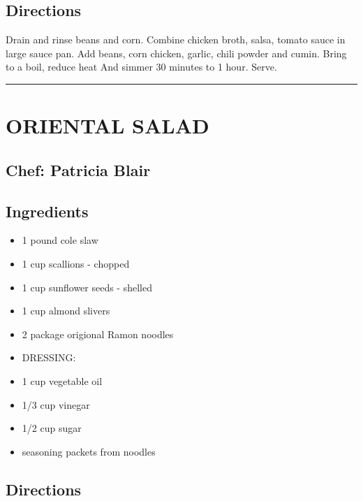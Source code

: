 \documentclass[
]{book}
\providecommand{\tightlist}{%
  \setlength{\itemsep}{0pt}\setlength{\parskip}{0pt}}
\begin{document}
\hypertarget{directions-21}{%
\subsection*{Directions}\label{directions-21}}


Drain and rinse beans and corn. Combine chicken broth, salsa, tomato sauce in large sauce pan.
Add beans, corn chicken, garlic, chili powder and cumin. Bring to a boil, reduce heat
And simmer 30 minutes to 1 hour. Serve.

\begin{center}\rule{0.5\linewidth}{0.5pt}\end{center}

\hypertarget{oriental-salad}{%
\section*{ORIENTAL SALAD}\label{oriental-salad}}


\hypertarget{chef-patricia-blair-6}{%
\subsection*{Chef: Patricia Blair}\label{chef-patricia-blair-6}}


\hypertarget{ingredients-22}{%
\subsection*{Ingredients}\label{ingredients-22}}


\begin{itemize}
\tightlist
\item
  1 pound cole slaw
\item
  1 cup scallions - chopped
\item
  1 cup sunflower seeds - shelled
\item
  1 cup almond slivers
\item
  2 package origional Ramon noodles
\item
  DRESSING:
\item
  1 cup vegetable oil
\item
  1/3 cup vinegar
\item
  1/2 cup sugar
\item
  seasoning packets from noodles
\end{itemize}

\hypertarget{directions-22}{%
\subsection*{Directions}\label{directions-22}}
\end{document}
